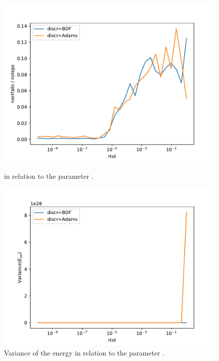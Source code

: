 \documentclass{report}
\begin{document}
\begin{figure}[h]
\centering
\begin{minipage}[b]{0.45\textwidth}
\centering
\includegraphics[width=\textwidth]{../Plots/Task4/Figure_312}
\caption{ in relation to the parameter .}
\label{pl:nerrfails_nsteps2}
\end{minipage}
\hfill
\begin{minipage}[b]{0.45\textwidth}
\centering
\includegraphics[width=\textwidth]{../Plots/Task4/Figure_304}
\caption{Variance of the energy in relation to the parameter .}
\label{pl:stability2}
\end{minipage}
\end{figure}
\end{document}
